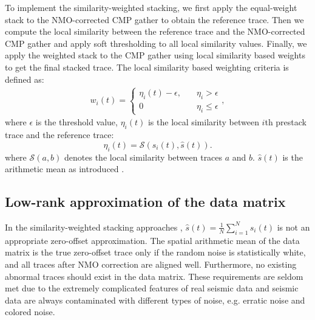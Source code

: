 To implement the similarity-weighted stacking, we first apply the equal-weight stack to the NMO-corrected CMP gather to obtain the reference trace. Then we compute the local similarity \cite{yangkang2015orthogroll} between the reference trace and the NMO-corrected CMP gather and apply soft thresholding \cite{donoho1995} to all local similarity values. Finally, we apply the weighted stack to the CMP gather using local similarity based weights to get the final stacked trace. %
The local similarity based weighting criteria is defined as:
\begin{align}
\label{eq:weight}
w_i(t)=\left\{\begin{array}{cl}
\eta_{i}(t)-\epsilon, & \quad \eta_i>\epsilon \\
0 & \quad  \eta_i \le \epsilon
\end{array},\right.
\end{align}
where $\epsilon$ is the threshold value, $\eta_i(t)$ is the local similarity between $i$th prestack trace and the reference trace:
\begin{equation}
\label{eq:eta}
\eta_i(t) = \mathcal{S}(s_i(t),\hat{s}(t)).
\end{equation}
where $\mathcal{S}(a,b)$ denotes the local similarity between traces $a$ and $b$. $\hat{s}(t)$ is the arithmetic mean as introduced . 

\subsection{Low-rank approximation of the data matrix}
In the similarity-weighted stacking approaches \wen{(\ref{eq:simistack})-(\ref{eq:eta})}, $\hat{s}(t)= \frac{1}{N}\sum_{i=1}^{N} s_i(t)$ is not an appropriate zero-offset approximation. The spatial arithmetic mean of the data matrix is the true zero-offset trace only if the random noise is statistically white, and all traces after NMO correction are aligned well. Furthermore, no existing abnormal traces should exist in the data matrix. These requirements are seldom met due to the extremely complicated features of real seismic data and seismic data are always contaminated with different types of noise, e.g. erratic noise and colored noise.

